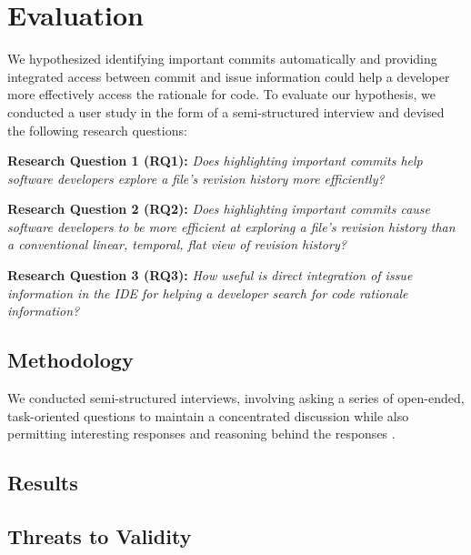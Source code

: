 \chapter{Evaluation}
\label{ch:Evaluation}

We hypothesized identifying important commits automatically and providing integrated access between commit and issue information could help a developer more effectively access the rationale for code.
To evaluate our hypothesis, we conducted a user study in the form of a semi-structured interview and devised the following research questions:

\textbf{Research Question 1 (RQ1):} \textit{Does highlighting important commits help software developers explore a file’s revision history more efficiently?}

\textbf{Research Question 2 (RQ2):} \textit{Does highlighting important commits cause software developers to be more efficient at exploring a file’s revision history than a conventional linear, temporal, flat view of revision history?}

\textbf{Research Question 3 (RQ3):} \textit{How useful is direct integration of issue information in the IDE for helping a developer search for code rationale information?}

\section{Methodology}
\label{sec:Methodology}

We conducted semi-structured interviews, involving asking a series of open-ended, task-oriented questions to maintain a concentrated discussion while also permitting
interesting responses and reasoning behind the responses \cite{shull_guide_2007}.

\section{Results}
\label{sec:Results}

\section{Threats to Validity}
\label{sec:Threads-to-Validity}

\endinput

Any text after an \endinput is ignored.
You could put scraps here or things in progress.